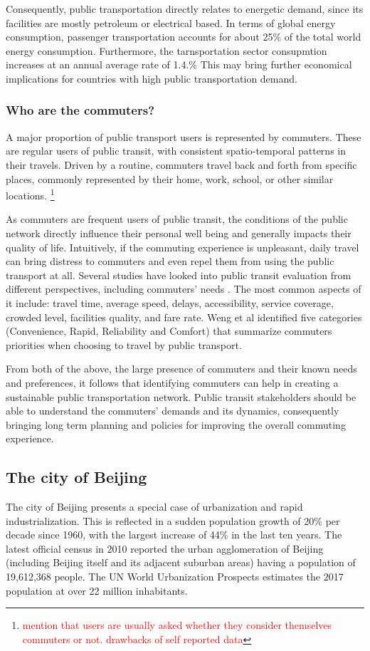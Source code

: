 \documentclass{article}
\newcommand{\selfnote}[1]{\footnote{\textcolor{red}{#1}}}
\begin{document}
Consequently, public transportation directly relates to energetic demand, since its facilities are mostly petroleum or electrical based. In terms of global energy consumption, passenger transportation accounts for about 25\% of the total world energy consumption. Furthermore, the tarnsportation sector consupmtion increases at an annual average rate of 1.4.\% \cite{eia2016energy} This may bring further economical implications for countries with high public transportation demand.

\subsubsection{Who are the commuters?}
A major proportion of public transport users is represented by commuters. These are regular users of public transit, with consistent spatio-temporal patterns in their travels. Driven by a routine, commuters travel back and forth from specific places, commonly represented by their home, work, school, or other similar locations. \selfnote{mention that users are usually asked whether they consider themselves commuters or not. drawbacks of self reported data}

As commuters are frequent users of public transit, the  conditions of the public network directly influence their personal well being and generally impacts their quality of life. Intuitively, if the commuting experience is unpleasant, daily travel can bring distress to commuters and even repel them from using the public transport at all. Several studies have looked into public transit evaluation from different perspectives, including commuters' needs \cite{mao2016commuting}. The most common aspects of it include: travel time, average speed, delays, accessibility, service coverage, crowded level, facilities quality, and fare rate. Weng et al \cite{weng2013bus} identified five categories (Convenience, Rapid, Reliability and Comfort) that summarize commuters priorities when choosing to travel by public transport.
 
From both of the above, the large presence of commuters and their known needs and preferences, it follows that identifying commuters can help in creating a sustainable public transportation network. Public transit stakeholders should be able to understand the commuters' demands and its dynamics, consequently bringing long term planning and policies for improving the overall commuting experience.

\subsection{The city of Beijing}
The city of Beijing presents a special case of urbanization and rapid industrialization. This is reflected in a sudden population growth of 20\% per decade since 1960, with the largest increase of 44\% in the last ten years. The latest official census in 2010 reported the urban agglomeration of Beijing (including Beijing itself and its adjacent suburban areas) having a population of 19,612,368 people. The UN World Urbanization Prospects estimates the 2017 population at over 22 million inhabitants. \cite{world2016beijing}
\end{document}
